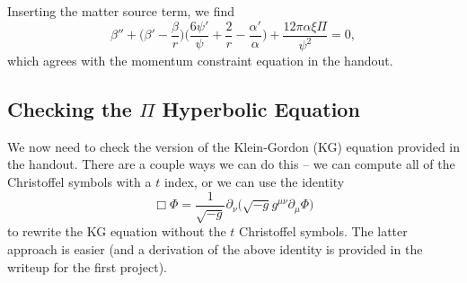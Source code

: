 \documentclass[12pt]{article}
\numberwithin{equation}{section}
\begin{document}
Inserting the matter source term, we find
\begin{equation}
\boxed{\beta'' + \Big( \beta' - \frac{\beta}{r} \Big) \Big( \frac{6 \psi'}{\psi} + \frac{2}{r} - \frac{\alpha'}{\alpha} \Big) + \frac{12 \pi \alpha \xi \Pi}{\psi^2} = 0},
\end{equation}
which agrees with the momentum constraint equation in the handout.

\subsection{Checking the $\Pi$ Hyperbolic Equation}
We now need to check the version of the Klein-Gordon (KG) equation provided in the handout.  There are a couple ways we can do this -- we can compute all of the Christoffel symbols with a $t$ index, or we can use the identity
\begin{equation}
\Box \Phi = \frac{1}{\sqrt{-g}} \partial_\nu \Big( \sqrt{-g} g^{\mu \nu} \partial_\mu \Phi \Big)
\end{equation}
to rewrite the KG equation without the $t$ Christoffel symbols.  The latter approach is easier (and a derivation of the above identity is provided in the writeup for the first project).
\end{document}
